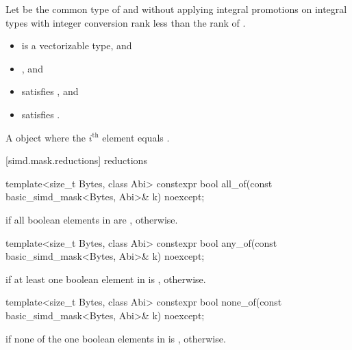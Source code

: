 \begin{itemdescr}
  \pnum Let  be the common type of  and  without
  applying integral promotions on integral types with integer conversion rank
  less than the rank of .

  \pnum\constraints
  \begin{itemize}
    \item {} is a vectorizable type, and
    \item {}, and
    \item {} satisfies , and
    \item {} satisfies .
  \end{itemize}

  \pnum\returns
  A  object where the $i^\text{th}$ element equals  \foralli.
\end{itemdescr}

[simd.mask.reductions]{ reductions}

\begin{itemdecl}
template<size_t Bytes, class Abi>
  constexpr bool all_of(const basic_simd_mask<Bytes, Abi>& k) noexcept;
\end{itemdecl}

\begin{itemdescr}
  \pnum\returns
   if all boolean elements in  are ,  otherwise.
\end{itemdescr}

\begin{itemdecl}
template<size_t Bytes, class Abi>
  constexpr bool any_of(const basic_simd_mask<Bytes, Abi>& k) noexcept;
\end{itemdecl}

\begin{itemdescr}
  \pnum\returns
   if at least one boolean element in  is ,  otherwise.
\end{itemdescr}

\begin{itemdecl}
template<size_t Bytes, class Abi>
  constexpr bool none_of(const basic_simd_mask<Bytes, Abi>& k) noexcept;
\end{itemdecl}

\begin{itemdescr}
  \pnum\returns
   if none of the one boolean elements in  is ,  otherwise.
\end{itemdescr}

